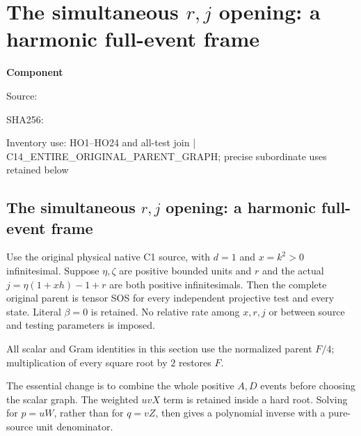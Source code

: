 \chapter{The simultaneous $r,j$ opening: a harmonic full-event frame}
\label{component:pbf6de1d7328a}
\noindent\textbf{Component }\par
{\small\noindent Source: \par}
{\small\noindent SHA256: \par}
{\small\noindent Inventory use: HO1--HO24 and all-test join | C14\_\allowbreak{}ENTIRE\_\allowbreak{}ORIGINAL\_\allowbreak{}PARENT\_\allowbreak{}GRAPH; precise subordinate uses retained below\par}
\medskip
\section{The simultaneous $r,j$ opening: a harmonic full-event frame}
\label{pbf6de1d7328a:sec:r13-c1-simultaneous-rj}

\begin{theorem}
Use the original physical native C1 source, with $d=1$ and $x=k^2>0$
infinitesimal. Suppose $\eta,\zeta$ are positive bounded units and
$r$ and the actual $j=\eta(1+xh)-1+r$ are both positive
infinitesimals. Then the complete original parent is tensor SOS for
every independent projective test and every state. Literal $\beta=0$
is retained. No relative rate among $x,r,j$ or between source and
testing parameters is imposed.
\end{theorem}

All scalar and Gram identities in this section use the normalized
parent $F/4$; multiplication of every square root by $2$ restores $F$.

The essential change is to combine the whole positive $A,D$ events
before choosing the scalar graph. The weighted $uvX$ term is retained
inside a hard root. Solving for $p=uW$, rather than for $q=vZ$,
then gives a polynomial inverse with a pure-source unit denominator.

